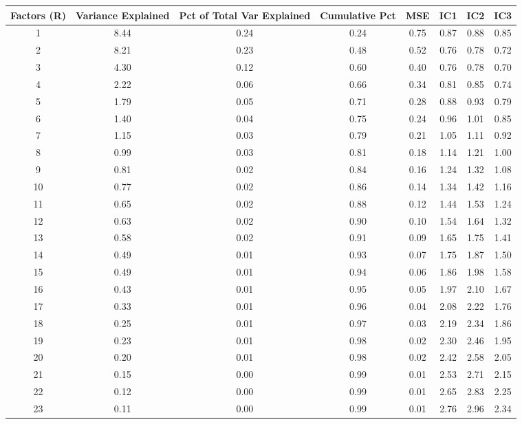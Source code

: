 \documentclass[11pt, letterpaper]{article}\usepackage[]{graphicx}\usepackage[]{color}
\begin{document}
\begin{table}[H]
\centering
\begingroup\scriptsize
\begin{tabular}{cccccccc}
  \hline
Factors (R) & Variance Explained & Pct of Total Var Explained & Cumulative Pct & MSE & IC1 & IC2 & IC3 \\ 
  \hline
  1 & 8.44 & 0.24 & 0.24 & 0.75 & 0.87 & 0.88 & 0.85 \\ 
    2 & 8.21 & 0.23 & 0.48 & 0.52 & 0.76 & 0.78 & 0.72 \\ 
    3 & 4.30 & 0.12 & 0.60 & 0.40 & 0.76 & 0.78 & 0.70 \\ 
    4 & 2.22 & 0.06 & 0.66 & 0.34 & 0.81 & 0.85 & 0.74 \\ 
    5 & 1.79 & 0.05 & 0.71 & 0.28 & 0.88 & 0.93 & 0.79 \\ 
    6 & 1.40 & 0.04 & 0.75 & 0.24 & 0.96 & 1.01 & 0.85 \\ 
    7 & 1.15 & 0.03 & 0.79 & 0.21 & 1.05 & 1.11 & 0.92 \\ 
    8 & 0.99 & 0.03 & 0.81 & 0.18 & 1.14 & 1.21 & 1.00 \\ 
    9 & 0.81 & 0.02 & 0.84 & 0.16 & 1.24 & 1.32 & 1.08 \\ 
   10 & 0.77 & 0.02 & 0.86 & 0.14 & 1.34 & 1.42 & 1.16 \\ 
   11 & 0.65 & 0.02 & 0.88 & 0.12 & 1.44 & 1.53 & 1.24 \\ 
   12 & 0.63 & 0.02 & 0.90 & 0.10 & 1.54 & 1.64 & 1.32 \\ 
   13 & 0.58 & 0.02 & 0.91 & 0.09 & 1.65 & 1.75 & 1.41 \\ 
   14 & 0.49 & 0.01 & 0.93 & 0.07 & 1.75 & 1.87 & 1.50 \\ 
   15 & 0.49 & 0.01 & 0.94 & 0.06 & 1.86 & 1.98 & 1.58 \\ 
   16 & 0.43 & 0.01 & 0.95 & 0.05 & 1.97 & 2.10 & 1.67 \\ 
   17 & 0.33 & 0.01 & 0.96 & 0.04 & 2.08 & 2.22 & 1.76 \\ 
   18 & 0.25 & 0.01 & 0.97 & 0.03 & 2.19 & 2.34 & 1.86 \\ 
   19 & 0.23 & 0.01 & 0.98 & 0.02 & 2.30 & 2.46 & 1.95 \\ 
   20 & 0.20 & 0.01 & 0.98 & 0.02 & 2.42 & 2.58 & 2.05 \\ 
   21 & 0.15 & 0.00 & 0.99 & 0.01 & 2.53 & 2.71 & 2.15 \\ 
   22 & 0.12 & 0.00 & 0.99 & 0.01 & 2.65 & 2.83 & 2.25 \\ 
   23 & 0.11 & 0.00 & 0.99 & 0.01 & 2.76 & 2.96 & 2.34 \\ 

\end{tabular}
\end{table}
\end{document}
